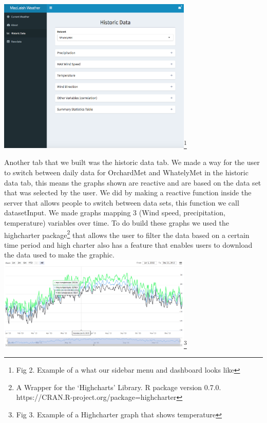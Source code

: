 \documentclass[10pt,letterpaper]{article}
\begin{document}
\includegraphics[width=3.64583in]{Weather Dashboard.png}\footnote{Fig 2.
  Example of a what our sidebar menu and dashboard looks like}

Another tab that we built was the historic data tab. We made a way for
the user to switch between daily data for OrchardMet and WhatelyMet in
the historic data tab, this means the graphs shown are reactive and are
based on the data set that was selected by the user. We did by making a
reactive function inside the server that allows people to switch between
data sets, this function we call datasetInput. We made graphs mapping 3
(Wind speed, precipitation, temperature) variables over time. To do
build these graphs we used the highcharter package\footnote{A Wrapper
  for the `Highcharts' Library. R package version 0.7.0.
  https://CRAN.R-project.org/package=highcharter} that allows the user
to filter the data based on a certain time period and high charter also
has a feature that enables users to download the data used to make the
graphic. \includegraphics[width=3.64583in]{highchart.png}\footnote{Fig
  3. Example of a Highcharter graph that shows temperature}
\end{document}

